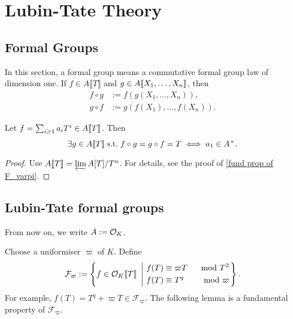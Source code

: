 \section{Lubin-Tate Theory}

\subsection{Formal Groups}
In this section, a formal group means a commutative formal group law of dimension one. If $f\in A\llbracket T\rrbracket$ and $g\in A\llbracket X_1, \dots, X_n \rrbracket$, then \begin{align*}
    f \circ g &:= f(g(X_1, \dots, X_n)),\\
    g\circ f &:= g(f(X_1), \dots, f(X_n)).
\end{align*}

\begin{lemma}\label{power series invertible iff}
    Let $f = \sum_{i\ge 1}a_iT^i\in A\llbracket T \rrbracket$. Then
    \[\exists g\in A\llbracket T \rrbracket \;\mathrm{s.t.}\; f\circ g = g\circ f = T\iff a_1\in A^\times.\]
\end{lemma}
\begin{proof}
    Use $A\llbracket T \rrbracket = \varprojlim A[T]/T^n$. For details, see the proof of \cref{fund prop of F_varpi}.
\end{proof}

\subsection{Lubin-Tate formal groups}
From now on, we write $A := \mathcal{O}_K$.

Choose a uniformiser $\varpi$ of $K$. Define
\[\mathcal{F}_\varpi := \left\{f\in\mathcal{O}_K\llbracket T \rrbracket\ \left|\ \begin{aligned}
    &f(T) \equiv \varpi T&\mod {T^2} \\
    &f(T)\equiv T^q&\mod \varpi
\end{aligned}\right.\right\}.\]
For example, $f(T) = T^q + \varpi T\in\mathcal{F}_\varpi$.
The following lemma is a fundamental property of $\mathcal{F}_\varpi$.

